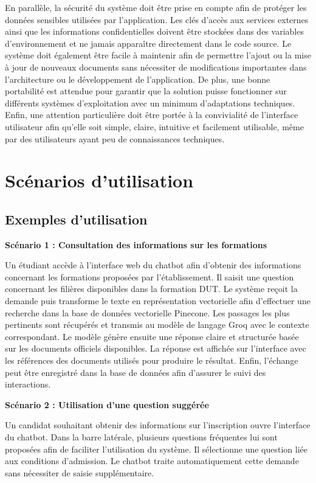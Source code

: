 \documentclass[12pt, a4paper, twoside]{report}
\begin{document}
En parallèle, la sécurité du système doit être prise en compte afin de protéger les données sensibles utilisées par l’application. Les clés d’accès aux services externes ainsi que les informations confidentielles doivent être stockées dans des variables d’environnement et ne jamais apparaître directement dans le code source. Le système doit également être facile à maintenir afin de permettre l’ajout ou la mise à jour de nouveaux documents sans nécessiter de modifications importantes dans l’architecture ou le développement de l’application. De plus, une bonne portabilité est attendue pour garantir que la solution puisse fonctionner sur différents systèmes d’exploitation avec un minimum d’adaptations techniques. Enfin, une attention particulière doit être portée à la convivialité de l’interface utilisateur afin qu’elle soit simple, claire, intuitive et facilement utilisable, même par des utilisateurs ayant peu de connaissances techniques.

\section{Scénarios d'utilisation}
\subsection{Exemples d'utilisation}

\textbf{Scénario 1 : Consultation des informations sur les formations}

Un étudiant accède à l’interface web du chatbot afin d’obtenir des informations concernant les formations proposées par l’établissement. Il saisit une question concernant les filières disponibles dans la formation DUT. 
\newpage
Le système reçoit la demande puis transforme le texte en représentation vectorielle afin d’effectuer une recherche dans la base de données vectorielle Pinecone. Les passages les plus pertinents sont récupérés et transmis au modèle de langage Groq avec le contexte correspondant. Le modèle génère ensuite une réponse claire et structurée basée sur les documents officiels disponibles. La réponse est affichée sur l’interface avec les références des documents utilisés pour produire le résultat. Enfin, l’échange peut être enregistré dans la base de données afin d’assurer le suivi des interactions.

\bigskip

\textbf{Scénario 2 : Utilisation d’une question suggérée}

Un candidat souhaitant obtenir des informations sur l’inscription ouvre l’interface du chatbot. Dans la barre latérale, plusieurs questions fréquentes lui sont proposées afin de faciliter l’utilisation du système. Il sélectionne une question liée aux conditions d’admission. Le chatbot traite automatiquement cette demande sans nécessiter de saisie supplémentaire.
\newline
\end{document}
